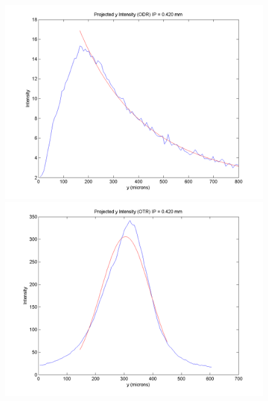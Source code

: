 \documentclass[12pt]{article}
\begin{document}
\begin{figure}
\begin{center}
\includegraphics[scale=0.5]{Figures/ProjY_ODR_420.PNG}
\includegraphics[scale=0.5]{Figures/ProjY_OTR_420.PNG}
\caption{}
\end{center}
\end{figure}
\end{document}
